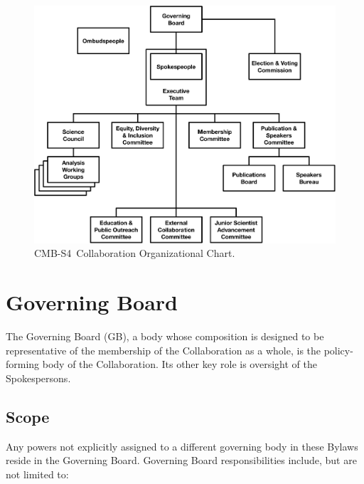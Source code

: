 \documentclass[12pt]{article}
\newcommand\collabname{CMB-S4}
\begin{document}
\begin{figure}[h!]
\begin{center}
\includegraphics[width=6.5in]{cmbs4_org_v11.pdf}
\end{center}
\caption{\collabname\ Collaboration Organizational Chart. }
\label{fig:org_chart}
\end{figure}

\section{Governing Board}

The Governing Board (GB), a body whose composition is designed to be representative of the membership of the Collaboration as a whole, is the policy-forming body of the Collaboration.  Its other key role is oversight of the Spokespersons.

\subsection{Scope}

Any powers not explicitly assigned to a different governing body in these Bylaws reside in the Governing Board. Governing Board responsibilities include, but are not limited to:
\end{document}
